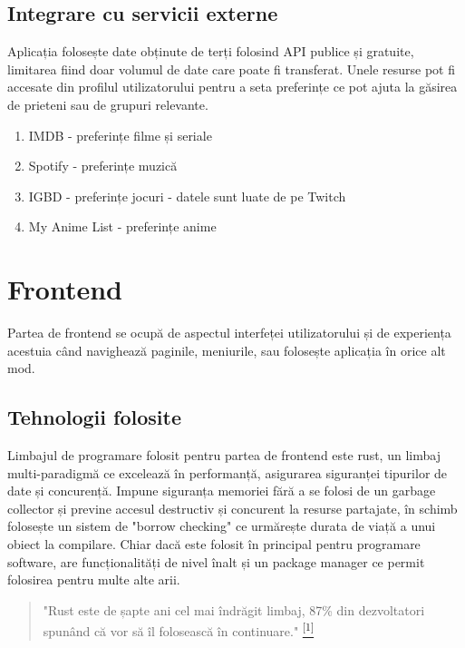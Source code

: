     \subsection{Integrare cu servicii externe}
    \label{Integrare cu servicii externe}
    Aplicația folosește date obținute de terți folosind API publice și gratuite, limitarea fiind doar volumul de date care poate fi transferat. Unele resurse pot fi accesate din profilul utilizatorului pentru a seta preferințe ce pot ajuta la găsirea de prieteni sau de grupuri relevante.

    \begin{enumerate}[noitemsep, leftmargin=0.3cm]
        \item IMDB - preferințe filme și seriale
        \item Spotify - preferințe muzică
        \item IGBD - preferințe jocuri - datele sunt luate de pe Twitch
        \item My Anime List - preferințe anime
    \end{enumerate}

    \section{Frontend}
    \label{Frontend}
    Partea de frontend se ocupă de aspectul interfeței utilizatorului și de experiența acestuia când navighează paginile, meniurile, sau folosește aplicația în orice alt mod.
    \subsection{Tehnologii folosite}
    \label{Frontend-tehnologii}
    Limbajul de programare folosit pentru partea de frontend este rust, un limbaj multi-paradigmă ce excelează în performanță, asigurarea siguranței tipurilor de date și concurență. Impune siguranța memoriei fără a se folosi de un garbage collector și previne accesul destructiv și concurent la resurse partajate, în schimb folosește un sistem de "borrow checking" ce urmărește durata de viață a unui obiect la compilare. Chiar dacă este folosit în principal pentru programare software, are funcționalități de nivel înalt și un package manager ce permit folosirea pentru multe alte arii.

    \begin{quote}
        "Rust este de șapte ani cel mai îndrăgit limbaj, 87\% din dezvoltatori spunând că vor să îl folosească în continuare." \hyperref[stackoverflow-studiu-2022]{\textsuperscript{[1]}}
    \end{quote}

